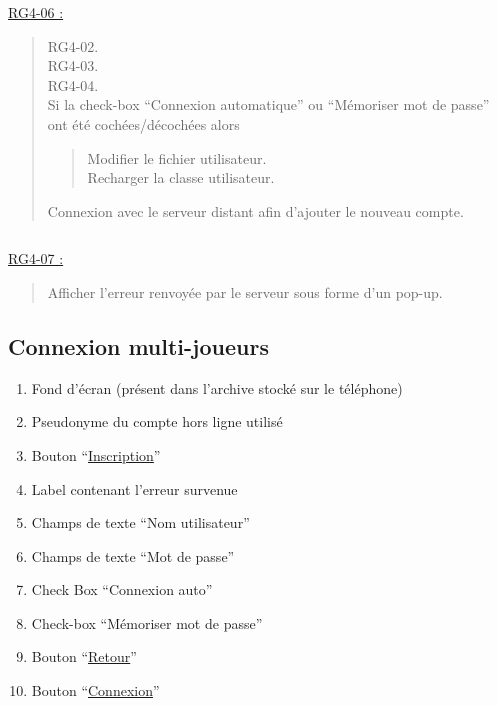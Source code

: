 \documentclass{report}
\begin{document}
			$\,$

			\underline{RG4-06 :}
				\begin{quote}
					RG4-02.\\
					RG4-03.\\
					RG4-04.\\
					Si la check-box ``Connexion automatique'' ou ``Mémoriser mot de passe'' ont été cochées/décochées alors
					\begin{quote}
						Modifier le fichier utilisateur.\\
						Recharger la classe utilisateur.
					\end{quote}
					Connexion avec le serveur distant afin d'ajouter le nouveau compte.
				\end{quote}

				
			$\,$
			
			\underline{RG4-07 :}
				\begin{quote}
					Afficher l'erreur renvoyée par le serveur sous forme d'un pop-up.
				\end{quote}
	
\newpage

	\subsection{Connexion multi-joueurs}
	
		\hypertarget{Connexion multi-joueurs}{}
		\label{Connexion multi-joueurs}
	
		\begin{center}
					
		\end{center}
		
		\begin{enumerate}
		  \item Fond d'écran (présent dans l'archive stocké sur le téléphone)
		  \item Pseudonyme du compte hors ligne utilisé
		  \item Bouton ``\hyperlink{Creation compte multi-joueurs}{Inscription}''
		  \item Label contenant l’erreur survenue
		  \item Champs de texte ``Nom utilisateur''
		  \item Champs de texte ``Mot de passe''
		  \item Check Box ``Connexion auto''
		  \item Check-box ``Mémoriser mot de passe''
		  \item Bouton ``\hyperlink{Accueil}{Retour}''
		  \item Bouton ``\hyperlink{Accueil multi-joueurs}{Connexion}''
		\end{enumerate}
\end{document}
